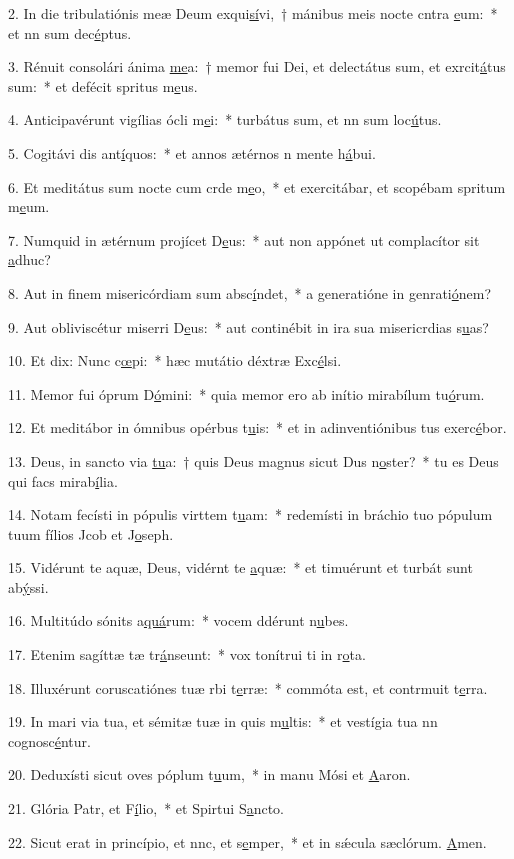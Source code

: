 2. In die tribulatiónis meæ Deum exqui\uline{sí}vi,~† mánibus meis nocte cntra \uline{e}um:~* et nn sum dec\uline{é}ptus.\par 
3. Rénuit consolári ánima \uline{me}a:~† memor fui Dei, et delectátus sum, et exrcit\uline{á}tus sum:~* et defécit spritus m\uline{e}us.\par 
4. Anticipavérunt vigílias ócli m\uline{e}i:~* turbátus sum, et nn sum loc\uline{ú}tus.\par 
5. Cogitávi dis ant\uline{í}quos:~* et annos ætérnos n mente h\uline{á}bui.\par 
6. Et meditátus sum nocte cum crde m\uline{e}o,~* et exercitábar, et scopébam spritum m\uline{e}um.\par 
7. Numquid in ætérnum projícet D\uline{e}us:~* aut non appónet ut complacítor sit \uline{a}dhuc?\par 
8. Aut in finem misericórdiam sum absc\uline{í}ndet,~* a generatióne in genrati\uline{ó}nem?\par 
9. Aut obliviscétur miserri D\uline{e}us:~* aut continébit in ira sua misericrdias s\uline{u}as?\par 
10. Et dix: Nunc c\uline{œ}pi:~* hæc mutátio déxtræ Exc\uline{é}lsi.\par 
11. Memor fui óprum D\uline{ó}mini:~* quia memor ero ab inítio mirabílum tu\uline{ó}rum.\par 
12. Et meditábor in ómnibus opérbus t\uline{u}is:~* et in adinventiónibus tus exerc\uline{é}bor.\par 
13. Deus, in sancto via \uline{tu}a:~† quis Deus magnus sicut Dus n\uline{o}ster?~* tu es Deus qui facs mirab\uline{í}lia.\par 
14. Notam fecísti in pópulis virttem t\uline{u}am:~* redemísti in bráchio tuo pópulum tuum fílios Jcob et J\uline{o}seph.\par 
15. Vidérunt te aquæ, Deus, vidérnt te \uline{a}quæ:~* et timuérunt et turbát sunt ab\uline{ý}ssi.\par 
16. Multitúdo sónits a\uline{quá}rum:~* vocem ddérunt n\uline{u}bes.\par 
17. Etenim sagíttæ tæ tr\uline{á}nseunt:~* vox tonítrui ti in r\uline{o}ta.\par 
18. Illuxérunt coruscatiónes tuæ rbi t\uline{e}rræ:~* commóta est, et contrmuit t\uline{e}rra.\par 
19. In mari via tua, et sémitæ tuæ in quis m\uline{u}ltis:~* et vestígia tua nn cognosc\uline{é}ntur.\par 
20. Deduxísti sicut oves póplum t\uline{u}um,~* in manu Mósi et \uline{A}aron.\par 
21. Glória Patr, et F\uline{í}lio,~* et Spirtui S\uline{a}ncto.\par 
22. Sicut erat in princípio, et nnc, et s\uline{e}mper,~* et in sǽcula sæclórum. \uline{A}men.\par 
